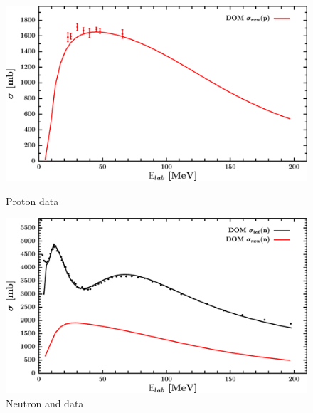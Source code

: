 \begin{figure}[H]
    \centering
    \begin{minipage}{0.45\textwidth}
        \centering
        \includegraphics[width=1.0\textwidth]{figures/sn124_protonInelastic.png}
        \caption{Proton \rxn data}
        \label{DOMFitData_sn124_proton_inelastic}
    \end{minipage}\hfill
    \begin{minipage}{0.45\textwidth}
        \centering
        \includegraphics[width=1.0\textwidth]{figures/sn124_neutronInelastic.png}
        \caption{Neutron \rxn and \tot data}
        \label{DOMFitData_sn124_neutron_inelastic}
    \end{minipage}
\end{figure}

\afterpage{\clearpage}

